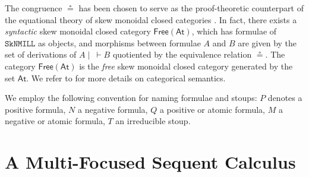 \documentclass[runningheads]{llncs}
\newcommand{\SkNMILL}{\texttt{SkNMILL}}
\newcommand{\FSkMCC}{\mathsf{Free}}
\newcommand{\At}{\mathsf{At}}
\begin{document}
The congruence $\circeq$ has been chosen to serve as the proof-theoretic counterpart of the equational theory of skew monoidal closed categories \cite{street:skew-closed:2013}.
In fact, there exists a \emph{syntactic} skew monoidal closed category $\FSkMCC(\At)$, which has formulae of $\SkNMILL$ as objects, and morphisms between formulae $A$ and $B$ are given by the set of derivations of $A \mid ~ \vdash B$ quotiented by the equivalence relation $\circeq$. The category $\FSkMCC(\At)$ is the \emph{free} skew monoidal closed category generated by the set $\At$. We refer to \cite{UVW:protsn} for more details on categorical semantics.

We employ the following convention for naming formulae and stoups:
$P$ denotes a positive formula, $N$ a negative formula, $Q$ a positive or atomic formula, $M$ a negative or atomic formula, $T$ an irreducible stoup.





\section{A Multi-Focused Sequent Calculus}\label{sec:focus}
\end{document}
